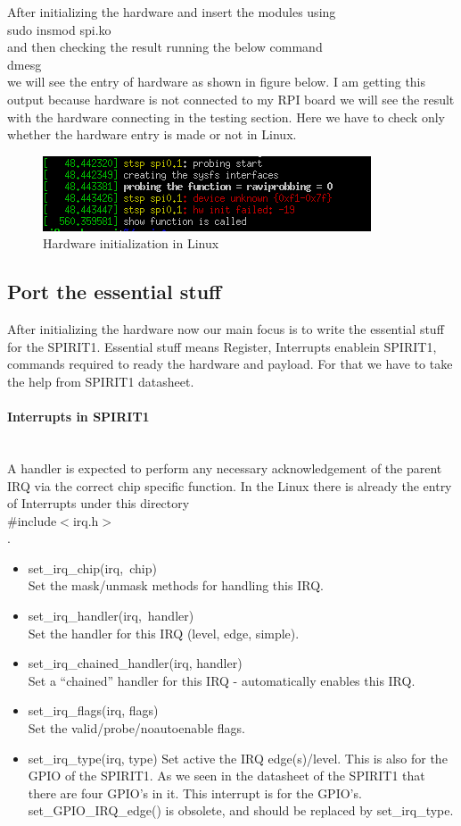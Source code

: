After initializing the hardware and insert the modules using \\ sudo insmod spi.ko \\ and then checking the result running the below command \\ dmesg \\ we will see the entry of hardware as shown in figure below. I am getting this output because hardware is not connected to my RPI board we will see the result with the hardware connecting in the testing section. Here we have to check only whether the hardware entry is made or not in Linux. \\
			\begin{figure}[ht]
				\centering
				\includegraphics[scale=1]{images/hardware_result.png}
				\caption{Hardware initialization in Linux}
			\end{figure}
\subsection{Port the essential stuff}
After initializing the hardware now our main focus is to write the essential stuff for the SPIRIT1. Essential stuff means Register, Interrupts enablein SPIRIT1, commands required to ready the hardware and payload. For that we have to take the help from SPIRIT1 datasheet. 
\paragraph{Interrupts in SPIRIT1} \\
A handler is expected to perform any necessary acknowledgement of the parent IRQ via the correct chip specific function. In the Linux there is already the entry of Interrupts under this directory \\ \#include$<$irq.h$>$\\. 
\begin{itemize}
\item set\_irq\_chip(irq,\ chip) \\
Set the mask/unmask methods for handling this IRQ.
\item set\_irq\_handler(irq,\ handler)\\
Set the handler for this IRQ (level, edge, simple).
\item set\_irq\_chained\_handler(irq, handler)\\
Set a ``chained'' handler for this IRQ - automatically enables this IRQ.
\item set\_irq\_flags(irq, flags)\\
Set the valid/probe/noautoenable flags.
\item set\_irq\_type(irq, type)
Set active the IRQ edge(s)/level. This is also for the GPIO of the SPIRIT1. As we seen in the datasheet of the SPIRIT1 that there are four GPIO's in it. This interrupt is for the GPIO's.
set\_GPIO\_IRQ\_edge() is obsolete, and should be replaced by set\_irq\_type.
\end{itemize}

